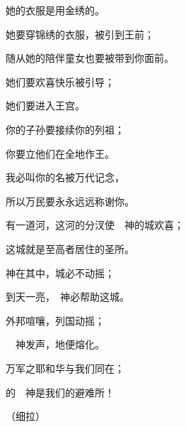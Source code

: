 {\par }{\Q 她的衣服是用金{}绣的。
\par }{\Q {}她要穿锦绣的衣服，被引到王前；
\par }{\Q 随从她的陪伴童女也要被带到你面前。
\par }{\Q {}她们要欢喜快乐被引导；
\par }{\Q 她们要进入王宫。
\par }{\BB \par }{\Q {}你的子孙要接续你的列祖；
\par }{\Q 你要立他们在全地作王。
\par }{\Q {}我必叫你的名被万代记念，
\par }{\Q 所以万民要永永远远称谢你。

\par }
{\BB \par }{\Q {}有一道河，这河的分汊使　神的城欢喜；
\par }{\Q 这城就是至高者居住的圣所。
\par }{\Q {}神在其中，城必不动摇；
\par }{\Q 到天一亮，　神必帮助这城。
\par }{\Q {}外邦喧嚷，列国动摇；
\par }{\Q 　神发声，地便熔化。
\par }{\Q {}万军之耶和华与我们同在；
\par }{的　神是我们的避难所！
\par }{\QS （细拉）
\par }
